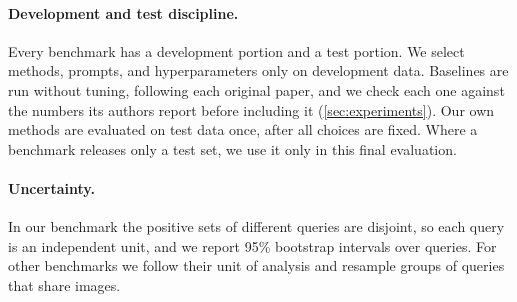 \paragraph{Development and test discipline.}
Every benchmark has a development portion and a test portion.
We select methods, prompts, and hyperparameters only on development data.
Baselines are run without tuning, following each original paper, and we check each one against the numbers its authors report before including it (\cref{sec:experiments}).
Our own methods are evaluated on test data once, after all choices are fixed.
Where a benchmark releases only a test set, we use it only in this final evaluation.

\paragraph{Uncertainty.}
In our benchmark the positive sets of different queries are disjoint, so each query is an independent unit, and we report 95\% bootstrap intervals over queries.
For other benchmarks we follow their unit of analysis and resample groups of queries that share images.
